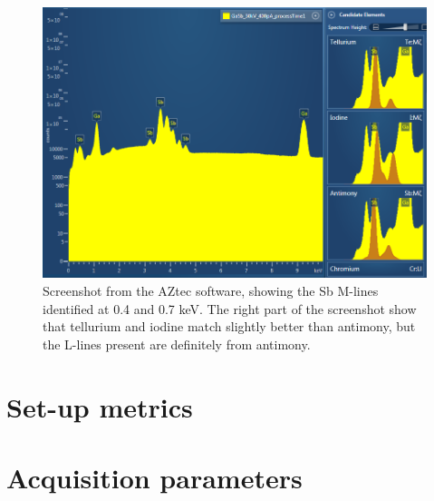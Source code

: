 \begin{figure}[htbp]
    \centering
    \includegraphics[width=0.95\linewidth]{figures/discussion/AZtec_Mlines.png}
    \caption{
        Screenshot from the AZtec software, showing the Sb M-lines identified at 0.4 and 0.7 keV.
        The right part of the screenshot show that tellurium and iodine match slightly better than antimony, but the L-lines present are definitely from antimony.
        }
    \label{fig:discussion:AZtec_Mlines}
\end{figure}

















\section{Set-up metrics}
\label{discussion:setup_metrics}













\section{Acquisition parameters}
\label{discussion:acquisition_parameters}















